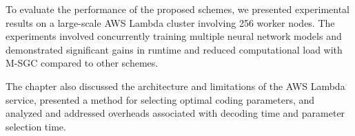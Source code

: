 To evaluate the performance of the proposed schemes, we presented experimental results on a large-scale AWS Lambda cluster involving 256 worker nodes. The experiments involved concurrently training multiple neural network models and demonstrated significant gains in runtime and reduced computational load with M-SGC compared to other schemes.

The chapter also discussed the architecture and limitations of the AWS Lambda service, presented a method for selecting optimal coding parameters, and analyzed and addressed overheads associated with decoding time and parameter selection time.






